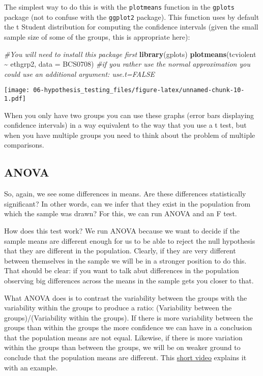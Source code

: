\documentclass[
]{book}
\newenvironment{Shaded}{\begin{snugshade}}{\end{snugshade}}
\newcommand{\AttributeTok}[1]{\textcolor[rgb]{0.13,0.29,0.53}{#1}}
\newcommand{\CommentTok}[1]{\textcolor[rgb]{0.56,0.35,0.01}{\textit{#1}}}
\newcommand{\FunctionTok}[1]{\textcolor[rgb]{0.13,0.29,0.53}{\textbf{#1}}}
\newcommand{\NormalTok}[1]{#1}
\newcommand{\SpecialCharTok}[1]{\textcolor[rgb]{0.81,0.36,0.00}{\textbf{#1}}}
\begin{document}
The simplest way to do this is with the \texttt{plotmeans} function in the \texttt{gplots} package (not to confuse with the \texttt{ggplot2} package). This function uses by default the t Student distribution for computing the confidence intervals (given the small sample size of some of the groups, this is appropriate here):

\begin{Shaded}
\begin{Highlighting}[]
\CommentTok{\#You will need to install this package first}
\FunctionTok{library}\NormalTok{(gplots)}
\FunctionTok{plotmeans}\NormalTok{(tcviolent }\SpecialCharTok{\textasciitilde{}}\NormalTok{ ethgrp2, }\AttributeTok{data =}\NormalTok{ BCS0708) }\CommentTok{\#if you rather use the normal approximation you could use an additional argument: use.t=FALSE}
\end{Highlighting}
\end{Shaded}

\texttt{[image: 06-hypothesis\_testing\_files/figure-latex/unnamed-chunk-10-1.pdf]}

When you only have two groups you can use these graphs (error bars displaying confidence intervals) in a way equivalent to the way that you use a t test, but when you have multiple groups you need to think about the problem of multiple comparisons.

\subsection{ANOVA}\label{anova}

So, again, we see some differences in means. Are these differences statistically significant? In other words, can we infer that they exist in the population from which the sample was drawn? For this, we can run ANOVA and an F test.

How does this test work? We run ANOVA because we want to decide if the sample means are different enough for us to be able to reject the null hypothesis that they are different in the population. Clearly, if they are very different between themselves in the sample we will be in a stronger position to do this. That should be clear: if you want to talk abut differences in the population observing big differences across the means in the sample gets you closer to that.

What ANOVA does is to contrast the variability between the groups with the variability within the groups to produce a ratio: (Variability between the groups)/(Variability within the groups). If there is more variability between the groups than within the groups the more confidence we can have in a conclusion that the population means are not equal. Likewise, if there is more variation within the groups than between the groups, we will be on weaker ground to conclude that the population means are different. This \href{https://www.youtube.com/watch?v=ITf4vHhyGpc}{short video} explains it with an example.
\end{document}
